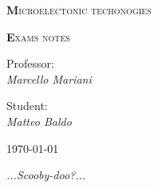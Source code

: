 \begin{titlepage}

	\centering
	{\scshape\huge\textbf Microelectonic techonogies \par}
	{\scshape\huge\textbf Exams notes \par}	
	\vspace{13cm}
{Professor:\\ \textit{Marcello Mariani}}	

\vspace{0.5cm}

{Student:\\ \textit{Matteo Baldo}}

\vspace{2cm}
	\vfill
	\raggedleft
	{\today\par}
	
\vspace{1cm}
\raggedright
{ \it ...Scooby-doo?...}
\end{titlepage}
        \newpage
		\setcounter{page}{2}
        \null 
        \thispagestyle{empty} 
        \newpage  


\tableofcontents
